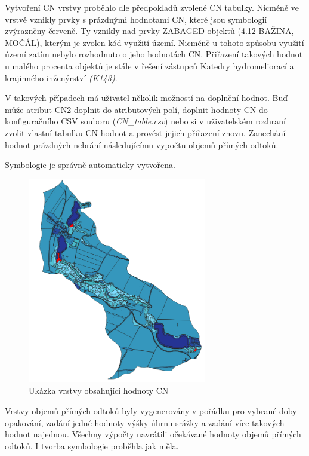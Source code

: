 \documentclass[a4paper,oneside,12pt]{book}
\begin{document}
\hspace{10mm} Vytvoření CN vrstvy proběhlo dle předpokladů zvolené CN tabulky. Nicméně ve vrstvě vznikly prvky s prázdnými hodnotami CN, které jsou symbologií zvýrazněny červeně. Ty vznikly nad prvky ZABAGED objektů (4.12 BAŽINA, MOČÁL), kterým je zvolen kód využití území. Nicméně u tohoto způsobu využití území zatím nebylo rozhodnuto o jeho hodnotách CN. Přiřazení takových hodnot u malého procenta objektů je stále v řešení zástupců Katedry hydromeliorací a krajinného inženýrství \textit{(K143)}.

\hspace{10mm} V takových případech má uživatel několik možností na doplnění hodnot. Buď může atribut CN2 doplnit do atributových polí, doplnit hodnoty CN do konfiguračního CSV souboru (\textit{CN\_table.csv}) nebo si v uživatelském rozhraní zvolit vlastní tabulku CN hodnot a provést jejich přiřazení znovu. Zanechání hodnot prázdných nebrání následujícímu vypočtu objemů přímých odtoků.

\hspace{10mm} Symbologie je správně automaticky vytvořena.

\begin{figure}[H] \label{obr28}
\centering
\includegraphics[height=9cm]{pictures/casestudy5.png}
\caption{Ukázka vrstvy obsahující hodnoty CN}
\label{cs5}
\end{figure}

\hspace{10mm} Vrstvy objemů přímých odtoků byly vygenerovány v pořádku pro vybrané doby opakování, zadání jedné hodnoty výšky úhrnu srážky a zadání více takových hodnot najednou. Všechny výpočty navrátili očekávané hodnoty objemů přímých odtoků. I tvorba symbologie proběhla jak měla. 
\end{document}
